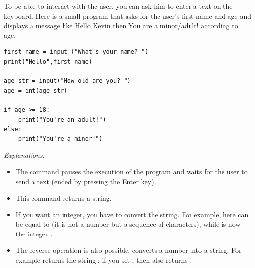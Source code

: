 \documentclass[11pt,class=report,crop=false]{standalone}
\begin{document}
\begin{cours}


To be able to interact with the user, you can ask him to enter a text on the keyboard.
Here is a small program that asks for the user's first name and age and displays a message like \og{}Hello Kevin\fg{} then \og{}You are a minor/adult!\fg{} according to age.

\begin{center}
\begin{minipage}{0.6\textwidth}
\begin{lstlisting}
first_name = input ("What's your name? ")
print("Hello",first_name)

age_str = input("How old are you? ")
age = int(age_str)

if age >= 18:
    print("You're an adult!")
else:
    print("You're a minor!")
\end{lstlisting}
\end{minipage} 
\end{center} 

\emph{Explanations.}
\begin{itemize}
  \item The command 
  pauses the execution of the program and waits for the user to send a text (ended by pressing the \og{}Enter\fg{} key).
  
  \item This command returns a string.
  
  \item {} If you want an integer, you have to convert the string. For example, here  can be equal to
   (it is not a number but a sequence of characters), while  is now the integer . 
  
  \item {} The reverse operation is also possible,  converts a number into a string. For example  returns the string ; if you set , then  also returns .
\end{itemize}

\end{cours}

\end{document}
